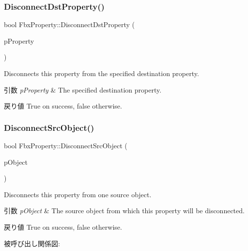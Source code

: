 \subsubsection{\texorpdfstring{Disconnect\+Dst\+Property()}{DisconnectDstProperty()}}
{\footnotesize\ttfamily bool Fbx\+Property\+::\+Disconnect\+Dst\+Property (\begin{DoxyParamCaption}\item[{const \hyperlink{class_fbx_property}{Fbx\+Property} \&}]{p\+Property }\end{DoxyParamCaption})}

Disconnects this property from the specified destination property. 
\begin{DoxyParams}{引数}
{\em p\+Property} & The specified destination property. \\
\hline
\end{DoxyParams}
\begin{DoxyReturn}{戻り値}
{\ttfamily True} on success, {\ttfamily false} otherwise. 
\end{DoxyReturn}
\mbox{\label{class_fbx_property_aaf72d2b89f03e122cea736ca8e060cab}} 
\subsubsection{\texorpdfstring{Disconnect\+Src\+Object()}{DisconnectSrcObject()}}
{\footnotesize\ttfamily bool Fbx\+Property\+::\+Disconnect\+Src\+Object (\begin{DoxyParamCaption}\item[{\hyperlink{class_fbx_object}{Fbx\+Object} $\ast$}]{p\+Object }\end{DoxyParamCaption})}

Disconnects this property from one source object. 
\begin{DoxyParams}{引数}
{\em p\+Object} & The source object from which this property will be disconnected. \\
\hline
\end{DoxyParams}
\begin{DoxyReturn}{戻り値}
{\ttfamily True} on success, {\ttfamily false} otherwise. 
\end{DoxyReturn}
被呼び出し関係図\+:
\mbox{\label{class_fbx_property_a25e6a00df6d1ec69db93a1d31c38374b}} 

